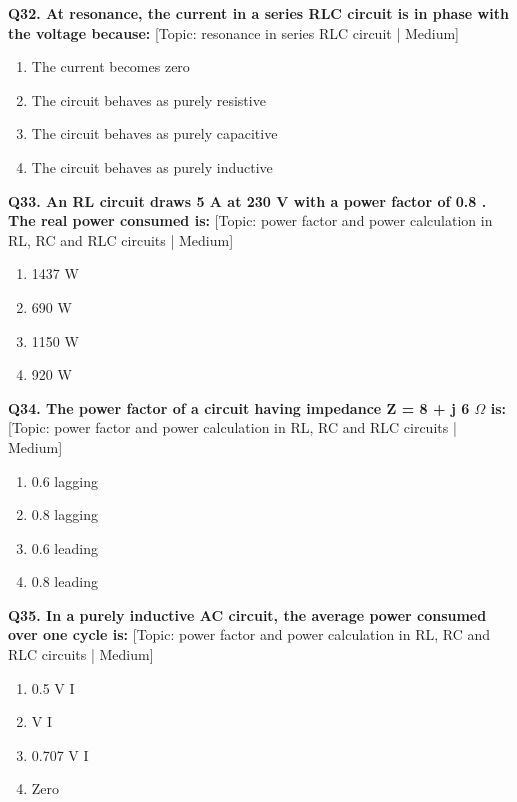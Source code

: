 \noindent\textbf{Q32. At resonance, the current in a series RLC circuit is in phase with the voltage because:} \hfill [Topic: resonance in series RLC circuit | Medium]
\begin{enumerate}[label=(\alph*),topsep=2pt,itemsep=1pt,partopsep=0pt,parsep=0pt]
    \item {The current becomes zero}
    \item {The circuit behaves as purely resistive}
    \item {The circuit behaves as purely capacitive}
    \item {The circuit behaves as purely inductive}
\end{enumerate}
\vspace{2mm}

\noindent\textbf{Q33. An RL circuit draws 5 A at 230 V with a power factor of 0.8 . The real power consumed is:} \hfill [Topic: power factor and power calculation in RL, RC and RLC circuits | Medium]
\begin{enumerate}[label=(\alph*),topsep=2pt,itemsep=1pt,partopsep=0pt,parsep=0pt]
    \item {1437 W}
    \item {690 W}
    \item {1150 W}
    \item {920 W}
\end{enumerate}
\vspace{2mm}

\noindent\textbf{Q34. The power factor of a circuit having impedance Z = 8 + j 6 $\Omega$ is:} \hfill [Topic: power factor and power calculation in RL, RC and RLC circuits | Medium]
\begin{enumerate}[label=(\alph*),topsep=2pt,itemsep=1pt,partopsep=0pt,parsep=0pt]
    \item {0.6 lagging}
    \item {0.8 lagging}
    \item {0.6 leading}
    \item {0.8 leading}
\end{enumerate}
\vspace{2mm}

\noindent\textbf{Q35. In a purely inductive AC circuit, the average power consumed over one cycle is:} \hfill [Topic: power factor and power calculation in RL, RC and RLC circuits | Medium]
\begin{enumerate}[label=(\alph*),topsep=2pt,itemsep=1pt,partopsep=0pt,parsep=0pt]
    \item {0.5 V I}
    \item {V I}
    \item {0.707 V I}
    \item {Zero}
\end{enumerate}
\vspace{2mm}

